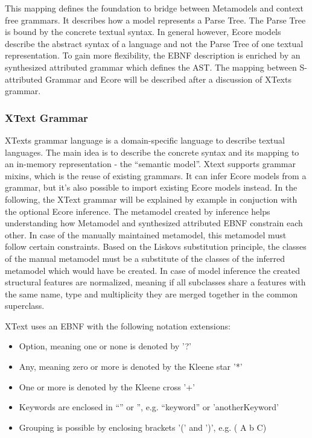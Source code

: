 This mapping defines the foundation to bridge between Metamodels and context free grammars. It describes how a model represents a Parse Tree. The Parse Tree is bound by the concrete textual syntax. In general however, Ecore models describe the abstract syntax of a language and not the Parse Tree of one textual representation. To gain more flexibility, the EBNF description is enriched by an synthesized attributed grammar which defines the AST. The mapping between S-attributed Grammar and Ecore will be described after a discussion of XTexts grammar.


\subsubsection{XText Grammar}
XTexts grammar language is a domain-specific language to describe textual languages. The main idea is to describe the concrete syntax and its mapping to an in-memory representation - the ``semantic model''. Xtext supports grammar mixins, which is the reuse of existing grammars. It can infer Ecore models from a grammar, but it's also possible to import existing Ecore models instead. In the following, the XText grammar will be explained by example in conjuction with the optional Ecore inference. The metamodel created by inference helps understanding how Metamodel and synthesized attributed EBNF constrain each other. In case of the manually maintained metamodel, this metamodel must follow certain constraints. Based on the Liskovs substitution principle, the classes of the manual metamodel must be a substitute of the classes of the inferred metamodel which would have be created. In case of model inference the created structural features are normalized, meaning if all subclasses share a features with the same name, type and multiplicity they are merged together in the common superclass.

XText uses an EBNF with the following notation extensions:
\begin{itemize}
	\item Option, meaning one or none is denoted by '?'
	\item Any, meaning zero or more is denoted by the Kleene star '*'
	\item One or more is denoted by the Kleene cross '+'
	\item Keywords are enclosed in ``'' or '', e.g. ``keyword'' or 'anotherKeyword'
	\item Grouping is possible by enclosing brackets '(' and  ')', e.g.  ( A b C)
\end{itemize}

